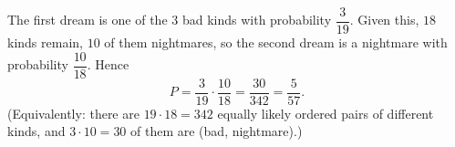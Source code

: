The first dream is one of the $3$ bad kinds with probability $\dfrac{3}{19}$. Given this, $18$ kinds remain, $10$ of them nightmares, so the second dream is a nightmare with probability $\dfrac{10}{18}$. Hence
\[
P=\dfrac{3}{19}\cdot\dfrac{10}{18}=\dfrac{30}{342}=\boxed{\dfrac{5}{57}}.
\]
(Equivalently: there are $19\cdot18=342$ equally likely ordered pairs of different kinds, and $3\cdot10=30$ of them are (bad, nightmare).)

